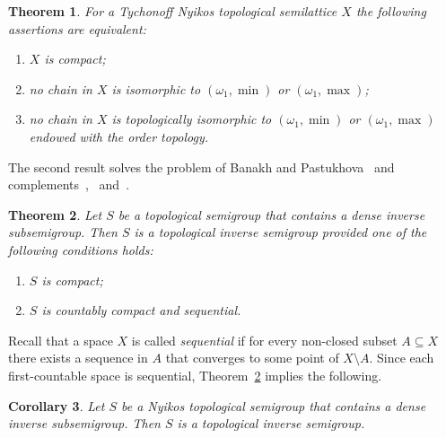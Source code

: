 \documentclass[12pt, twoside, leqno]{article}
\newtheorem{theorem}{Theorem}[section]
\newtheorem{corollary}[theorem]{Corollary}
\theoremstyle{definition}
\numberwithin{equation}{section}
\newcommand{\w}{\omega}
\begin{document}
\begin{theorem}\label{semilattice}
For a Tychonoff Nyikos topological semilattice $X$ the following assertions are equivalent:
\begin{enumerate}[label=(\roman*)]
    \item $X$ is compact;
    \item no chain in $X$ is isomorphic to  $(\w_1,\min)$ or $(\w_1,\max)$;
    \item no chain in $X$ is topologically isomorphic to $(\w_1,\min)$ or $(\w_1,\max)$ endowed with the order topology.
\end{enumerate}        
\end{theorem}

The second result solves the problem of Banakh and Pastukhova~\cite[Problem 2.2]{BP} and complements~\cite[Proposition 2.1]{BP},~\cite[Theorem 7]{GR} and~\cite[Corollary 1]{BG}.




\begin{theorem}\label{inverse}
Let $S$ be a topological semigroup that contains a dense inverse subsemigroup. Then $S$ is a topological inverse semigroup provided one of the following conditions holds:
\begin{enumerate}[label=(\roman*)]
   \item $S$ is compact;
  \item  $S$ is countably compact and sequential.
\end{enumerate}   
\end{theorem} 

Recall that a space $X$ is called {\em sequential} if for every non-closed subset $A\subseteq X$ there exists a sequence in $A$ that converges to some point of $X\setminus A$.
Since each first-countable space is sequential, Theorem~\ref{inverse} implies the following.

\begin{corollary}\label{corNyikos}
Let $S$ be a Nyikos topological semigroup that contains a dense inverse subsemigroup. Then $S$ is a topological inverse semigroup.    
\end{corollary}
\end{document}
